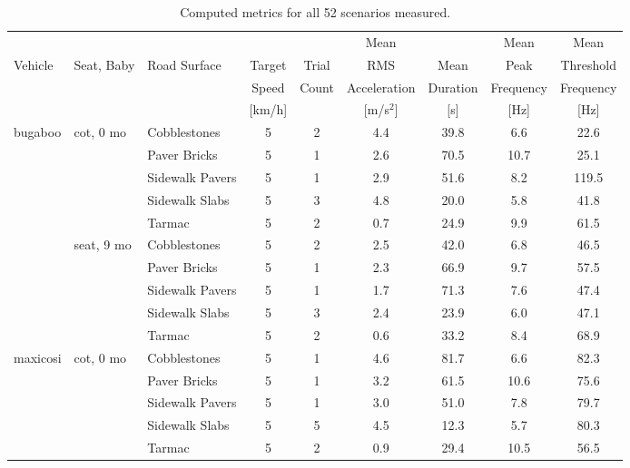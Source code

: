 \documentclass[a4paper]{article}
\begin{document}
\begin{table}
  \centering
  \caption{Computed metrics for all 52 scenarios measured.}
  \label{tab:results}
  \footnotesize
\begin{tabular}{lllcccccc}
\toprule
        &            &              &        &       & Mean         &          & Mean      & Mean      \\
Vehicle & Seat, Baby & Road Surface & Target & Trial & RMS          & Mean     & Peak      & Threshold \\
        &            &              & Speed  & Count & Acceleration & Duration & Frequency & Frequency \\
        &            &              & [km/h] &       &  [m/s\(^2\)]     & [s]      & [Hz]      & [Hz]      \\
\midrule
\multirow[t]{10}{*}{bugaboo} & \multirow[t]{5}{*}{cot, 0 mo} & Cobblestones & 5 & 2 & 4.4 & 39.8 & 6.6 & 22.6 \\
\cline{3-9}
 &  & Paver Bricks & 5 & 1 & 2.6 & 70.5 & 10.7 & 25.1 \\
\cline{3-9}
 &  & Sidewalk Pavers & 5 & 1 & 2.9 & 51.6 & 8.2 & 119.5 \\
\cline{3-9}
 &  & Sidewalk Slabs & 5 & 3 & 4.8 & 20.0 & 5.8 & 41.8 \\
\cline{3-9}
 &  & Tarmac & 5 & 2 & 0.7 & 24.9 & 9.9 & 61.5 \\
\cline{2-9} \cline{3-9}
 & \multirow[t]{5}{*}{seat, 9 mo} & Cobblestones & 5 & 2 & 2.5 & 42.0 & 6.8 & 46.5 \\
\cline{3-9}
 &  & Paver Bricks & 5 & 1 & 2.3 & 66.9 & 9.7 & 57.5 \\
\cline{3-9}
 &  & Sidewalk Pavers & 5 & 1 & 1.7 & 71.3 & 7.6 & 47.4 \\
\cline{3-9}
 &  & Sidewalk Slabs & 5 & 3 & 2.4 & 23.9 & 6.0 & 47.1 \\
\cline{3-9}
 &  & Tarmac & 5 & 2 & 0.6 & 33.2 & 8.4 & 68.9 \\
\cline{1-9} \cline{2-9} \cline{3-9}
\multirow[t]{10}{*}{maxicosi} & \multirow[t]{5}{*}{cot, 0 mo} & Cobblestones & 5 & 1 & 4.6 & 81.7 & 6.6 & 82.3 \\
\cline{3-9}
 &  & Paver Bricks & 5 & 1 & 3.2 & 61.5 & 10.6 & 75.6 \\
\cline{3-9}
 &  & Sidewalk Pavers & 5 & 1 & 3.0 & 51.0 & 7.8 & 79.7 \\
\cline{3-9}
 &  & Sidewalk Slabs & 5 & 5 & 4.5 & 12.3 & 5.7 & 80.3 \\
\cline{3-9}
 &  & Tarmac & 5 & 2 & 0.9 & 29.4 & 10.5 & 56.5 \\

\end{tabular}
\end{table}
\end{document}
